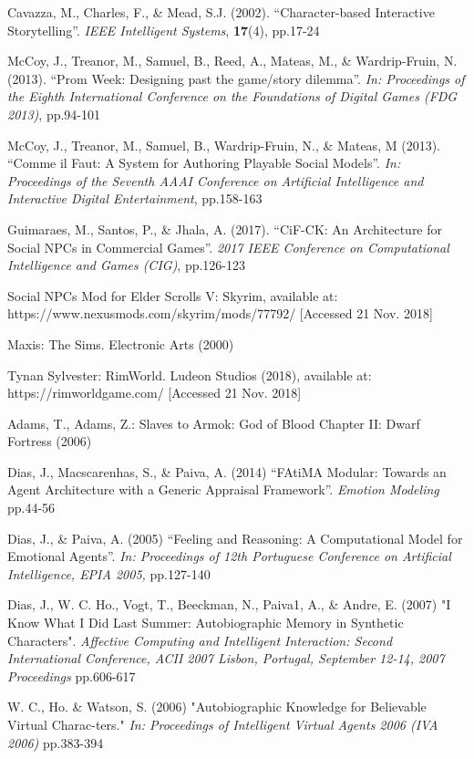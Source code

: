 \documentclass{sig-alternate-05-2015}
\begin{document}
\begin{thebibliography}{20}
Cavazza, M., Charles, F., \& Mead, S.J. (2002).
``Character-based Interactive Storytelling''.
\textit{IEEE Intelligent Systems}, \textbf{17}(4), pp.17-24

McCoy, J., Treanor, M., Samuel, B., Reed, A., Mateas, M., \& Wardrip-Fruin, N. (2013).
``Prom Week: Designing past the game/story dilemma''.
\textit{In: Proceedings of the Eighth International Conference on the Foundations of Digital Games (FDG 2013)}, pp.94-101

McCoy, J., Treanor, M., Samuel, B., Wardrip-Fruin, N., \& Mateas, M (2013).
``Comme il Faut: A System for Authoring Playable Social Models''.
\textit{In: Proceedings of the Seventh AAAI Conference on Artificial Intelligence and Interactive Digital Entertainment}, pp.158-163

Guimaraes, M., Santos, P., \& Jhala, A. (2017).
``CiF-CK: An Architecture for Social NPCs in Commercial Games''.
\textit{2017 IEEE Conference on Computational Intelligence and Games (CIG)}, pp.126-123

Social NPCs Mod for Elder Scrolls V: Skyrim, available at: https://www.nexusmods.com/skyrim/mods/77792/ [Accessed 21 Nov. 2018]

Maxis: The Sims. Electronic Arts (2000)

Tynan Sylvester: RimWorld. Ludeon Studios (2018), available at: https://rimworldgame.com/ [Accessed 21 Nov. 2018]

Adams, T., Adams, Z.: Slaves to Armok: God of Blood Chapter II: Dwarf Fortress (2006)

Dias, J., Macscarenhas, S., \& Paiva, A. (2014)
``FAtiMA Modular: Towards an Agent Architecture with
a Generic Appraisal Framework''.
\textit{Emotion Modeling} pp.44-56

Dias, J., \& Paiva, A. (2005)
``Feeling and Reasoning: A Computational Model for Emotional Agents''.
\textit{In: Proceedings of 12th Portuguese Conference on Artificial Intelligence, EPIA 2005,} pp.127-140

Dias, J., W. C. Ho., Vogt, T., Beeckman, N., Paiva1, A., \& Andre, E. (2007)
"I Know What I Did Last Summer: Autobiographic Memory in Synthetic Characters".
\textit{Affective Computing and Intelligent Interaction: Second International Conference, ACII 2007 Lisbon, Portugal, September 12-14, 2007 Proceedings} pp.606-617

W. C., Ho. \& Watson, S. (2006) 
"Autobiographic Knowledge for Believable Virtual Charac-ters." 
\textit{In: Proceedings of Intelligent Virtual Agents 2006 (IVA 2006)} pp.383-394



\end{thebibliography}
 
\end{document}
